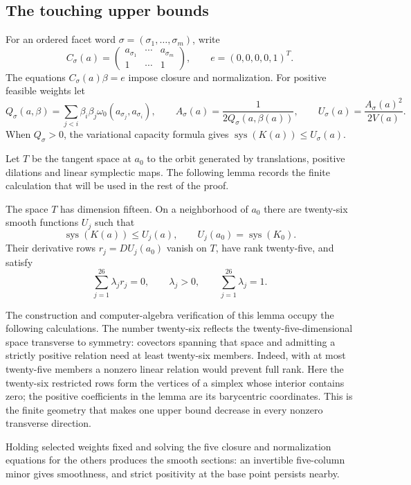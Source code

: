 \subsection{The touching upper bounds}
For an ordered facet word $\sigma=(\sigma_1,\ldots,\sigma_m)$, write
\[
 C_\sigma(a)=
 \begin{pmatrix}a_{\sigma_1}&\cdots&a_{\sigma_m}\\1&\cdots&1\end{pmatrix},
 \qquad e=(0,0,0,0,1)^T.
\]
The equations $C_\sigma(a)\beta=e$ impose closure and normalization.
For positive feasible weights let
\[
 Q_\sigma(a,\beta)=\sum_{j<i}\beta_i\beta_j
 \omega_0(a_{\sigma_j},a_{\sigma_i}),\qquad
 A_\sigma(a)=\frac1{2Q_\sigma(a,\beta(a))},\qquad
 U_\sigma(a)=\frac{A_\sigma(a)^2}{2V(a)}.
\]
When $Q_\sigma>0$, the variational capacity formula gives
$\operatorname{sys}(K(a))\leq U_\sigma(a)$.

Let $T$ be the tangent space at $a_0$ to the orbit generated by translations,
positive dilations and linear symplectic maps. The following lemma records
the finite calculation that will be used in the rest of the proof.
\begin{lemma}\label{lem:hko-exact-bounds}
The space $T$ has dimension fifteen. On a neighborhood of $a_0$ there are
twenty-six smooth functions $U_j$ such that
\[
 \operatorname{sys}(K(a))\leq U_j(a),\qquad
 U_j(a_0)=\operatorname{sys}(K_0).
\]
Their derivative rows $r_j=DU_j(a_0)$ vanish on $T$, have rank twenty-five,
and satisfy
\[
 \sum_{j=1}^{26}\lambda_jr_j=0,\qquad
 \lambda_j>0,\qquad \sum_{j=1}^{26}\lambda_j=1.
\]
\end{lemma}
The construction and computer-algebra verification of this lemma occupy
the following calculations. The number twenty-six reflects the
twenty-five-dimensional space transverse to symmetry: covectors spanning
that space and admitting a strictly positive relation need at least
twenty-six members. Indeed, with at most twenty-five members a nonzero
linear relation would prevent full rank. Here the twenty-six restricted
rows form the vertices of a simplex whose interior contains zero; the
positive coefficients in the lemma are its barycentric coordinates.
This is the finite geometry that makes one upper bound decrease in every
nonzero transverse direction.

Holding selected weights fixed and solving
the five closure and normalization equations for the others produces the
smooth sections: an invertible five-column minor gives smoothness, and
strict positivity at the base point persists nearby.

